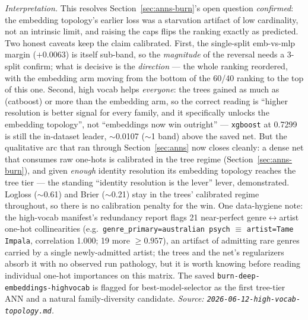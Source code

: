 \documentclass[11pt]{article}
\begin{document}
\emph{Interpretation.} This resolves Section~\ref{sec:anns-burn}'s open question
\emph{confirmed}: the embedding topology's earlier loss was a starvation
artifact of low cardinality, not an intrinsic limit, and raising the caps flips
the ranking exactly as predicted. Two honest caveats keep the claim calibrated.
First, the single-split emb-vs-mlp margin ($+0.0063$) is itself sub-band, so the
\emph{magnitude} of the reversal needs a 3-split confirm; what is decisive is
the \emph{direction} --- the whole ranking reordered, with the embedding arm
moving from the bottom of the 60/40 ranking to the top of this one. Second, high
vocab helps \emph{everyone}: the trees gained as much as (catboost) or more than
the embedding arm, so the correct reading is ``higher resolution is better
signal for every family, and it specifically unlocks the embedding topology'',
not ``embeddings now win outright'' --- \texttt{xgboost} at \num{0.7299} is still
the in-dataset leader, $\sim$\num{0.0107} ($\sim$1 band) above the saved net.
But the qualitative arc that ran through Section~\ref{sec:anns} now closes
cleanly: a dense net that consumes raw one-hots is calibrated in the tree regime
(Section~\ref{sec:anns-burn}), and given \emph{enough} identity resolution its
embedding topology reaches the tree tier --- the standing ``identity resolution
is the lever'' lever, demonstrated. Logloss ($\sim$0.61) and Brier ($\sim$0.21)
stay in the trees' calibrated regime throughout, so there is no calibration
penalty for the win. One data-hygiene note: the high-vocab manifest's redundancy
report flags 21 near-perfect genre$\leftrightarrow$artist one-hot collinearities
(e.g.\ \texttt{genre\_primary=australian psych} $\equiv$ \texttt{artist=Tame
Impala}, correlation \num{1.000}; 19 more $\ge\num{0.957}$), an artifact of
admitting rare genres carried by a single newly-admitted artist; the trees and
the net's regularizers absorb it with no observed run pathology, but it is worth
knowing before reading individual one-hot importances on this matrix. The saved
\texttt{burn-deep-embeddings-highvocab} is flagged for best-model-selector as
the first tree-tier ANN and a natural family-diversity candidate.
\emph{Source: \texttt{2026-06-12-high-vocab-topology.md}.}
\end{document}
